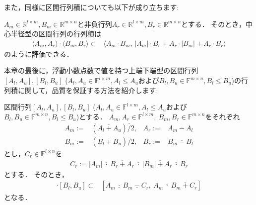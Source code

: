また，同様に区間行列積についても以下が成り立ちます:
\begin{Thm}[中心半径型の区間行列の行列積] \label{thm:midrad_matpro}
	$A_m \in {\mathbb R}^{l \times m},  B_m \in {\mathbb R}^{m \times n} $と非負行列$A_r \in {\mathbb R}^{l \times m},  B_r \in {\mathbb R}^{m \times n} $とする．	  
	そのとき，中心半径型の区間行列の行列積は
	\begin{align*}
		\langle A_m, A_r \rangle \cdot \langle B_m, B_r \rangle \subset& \langle A_m \cdot B_m, ~ | A_m | \cdot B_r + A_r \cdot | B_m | + A_r \cdot B_r \rangle
	\end{align*}
	のように評価できる．
\end{Thm}

本章の最後に，浮動小数点数で値を持つ上端下端型の区間行列$[A_l, A_u], [B_l, B_u]$ ($A_l, A_u \in {\mathbb F}^{l \times m}, A_l \le A_u$および$B_l, B_u \in {\mathbb F}^{m \times n}, B_l \le B_u$)の行列積に関して，品質を保証する方法を紹介します:

\begin{Thm}[浮動小数点数を両端にもつ上端下端型の区間行列積] \label{thm:interval_matmul}
	区間行列$[A_l, A_u], [B_l, B_u]$ ($A_l, A_u \in {\mathbb F}^{l \times m}, A_l \le A_u$および$B_l, B_u \in {\mathbb F}^{m \times n}, B_l \le B_u$)とする．
	$A_m, A_r \in  {\mathbb F}^{l \times m}, ~ B_m, B_r \in {\mathbb F}^{m \times n} $をそれぞれ
	\begin{align*}
		A_m :=& (A_l ~ \overline{+} ~ A_u)\overline{/}2,& A_r :=&  A_m ~ \overline{-} ~ A_l\\
		B_m :=& (B_l ~ \overline{+} ~ B_u)\overline{/}2,& B_r :=&  B_m ~ \overline{-} ~ B_l
	\end{align*}
	とし，$C_r \in {\mathbb F}^{l \times n}$を
	\begin{align*}
		C_r := | A_m | ~ \overline{\cdot} ~ B_r ~ \overline{+} ~ A_r ~ \overline{\cdot} ~ | B_m | ~ \overline{+} ~ A_r ~ \overline{\cdot} ~ B_r
	\end{align*}
	とする．
	そのとき，
	\begin{align*}
		[A_l, A_u] \cdot  [B_l, B_u ] \subset& [ A_m  ~ \underline{\cdot} ~ B_m  ~ \underline{-} ~ C_r, ~ A_m ~ \overline{\cdot} ~ B_m ~ \overline{+} ~ C_r ]
	\end{align*}
	となる．
\end{Thm}


